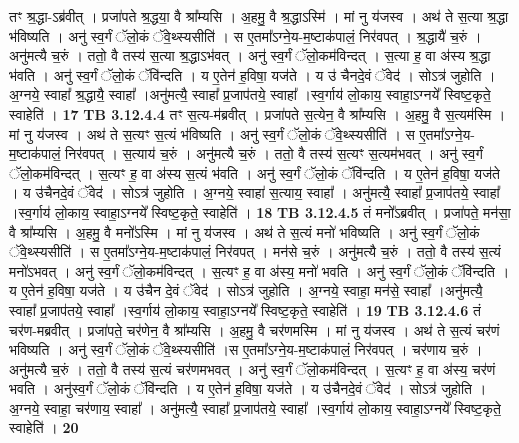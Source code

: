 \documentclass[17pt]{extarticle}
\begin{document}
{{{{{{{{{{{{{{{{{{{{{{{                  तꣳ श्र॒द्धा-ऽब्र॑वीत् । प्रजा॑पते श्र॒द्धया॒ वै श्रा᳚म्यसि । अ॒हमु॒ वै श्र॒द्धाऽस्मि॑ । मां नु य॑जस्व । अथ॑ ते स॒त्या श्र॒द्धा भ॑विष्यति । अनु॑ स्व॒र्गं ॅलो॒कं ॅवे॒थ्स्यसीति॑ । स ए॒तमा᳚ऽग्ने॒य-म॒ष्टाक॑पालं॒ निर॑वपत् । श्र॒द्धायै॑ च॒रुं । अनु॑मत्यै च॒रुं । ततो॒ वै तस्य॑ स॒त्या श्र॒द्धाऽभ॑वत् । अनु॑ स्व॒र्गं ॅलो॒कम॑विन्दत् । स॒त्या ह॒ वा अ॑स्य श्र॒द्धा भ॑वति । अनु॑ स्व॒र्गं ॅलो॒कं ॅवि॑न्दति । य ए॒तेन॑ ह॒विषा॒ यज॑ते । य उ॑ चैनदे॒वं ॅवेद॑ । सोऽत्र॑ जुहोति । अ॒ग्नये॒ स्वाहा᳚ श्र॒द्धायै॒ स्वाहा᳚ ।अनु॑मत्यै॒ स्वाहा᳚ प्र॒जाप॑तये॒ स्वाहा᳚ ।स्व॒र्गाय॑ लो॒काय॒ स्वाहा॒ऽग्नये᳚ स्विष्ट॒कृते॒ स्वाहेति॑ । \textbf{ 17} \newline
                  \newline
                                \textbf{ TB 3.12.4.4} \newline
                  तꣳ स॒त्य-म॑ब्रवीत् । प्रजा॑पते स॒त्येन॒ वै श्रा᳚म्यसि । अ॒हमु॒ वै स॒त्यम॑स्मि । मां नु य॑जस्व । अथ॑ ते स॒त्यꣳ स॒त्यं भ॑विष्यति । अनु॑ स्व॒र्गं ॅलो॒कं ॅवे॒थ्स्यसीति॑ । स ए॒तमा᳚ऽग्ने॒य-म॒ष्टाक॑पालं॒ निर॑वपत् । स॒त्याय॑ च॒रुं । अनु॑मत्यै च॒रुं । ततो॒ वै तस्य॑ स॒त्यꣳ स॒त्यम॑भवत् । अनु॑ स्व॒र्गं ॅलो॒कम॑विन्दत् । स॒त्यꣳ ह॒ वा अ॑स्य स॒त्यं भ॑वति । अनु॑ स्व॒र्गं ॅलो॒कं ॅवि॑न्दति । य ए॒तेन॑ ह॒विषा॒ यज॑ते । य उ॑चैनदे॒वं ॅवेद॑ । सोऽत्र॑ जुहोति । अ॒ग्नये॒ स्वाहा॑ स॒त्याय॒ स्वाहा᳚ । अनु॑मत्यै॒ स्वाहा᳚ प्र॒जाप॑तये॒ स्वाहा᳚ ।स्व॒र्गाय॑ लो॒काय॒ स्वाहा॒ऽग्नये᳚ स्विष्ट॒कृते॒ स्वाहेति॑ । \textbf{ 18} \newline
                  \newline
                                \textbf{ TB 3.12.4.5} \newline
                  तं मनो᳚ऽब्रवीत् । प्रजा॑पते॒ मन॑सा॒ वै श्रा᳚म्यसि । अ॒हमु॒ वै मनो᳚ऽस्मि । मां नु य॑जस्व । अथ॑ ते स॒त्यं मनो॑ भविष्यति । अनु॑ स्व॒र्गं ॅलो॒कं ॅवे॒थ्स्यसीति॑ । स ए॒तमा᳚ऽग्ने॒य-म॒ष्टाक॑पालं॒ निर॑वपत् । मन॑से च॒रुं । अनु॑मत्यै च॒रुं । ततो॒ वै तस्य॑ स॒त्यं मनो॑ऽभवत् । अनु॑ स्व॒र्गं ॅलो॒कम॑विन्दत् । स॒त्यꣳ ह॒ वा अ॑स्य॒ मनो॑ भवति । अनु॑ स्व॒र्गं ॅलो॒कं ॅवि॑न्दति । य ए॒तेन॑ ह॒विषा॒ यज॑ते । य उ॑चैन दे॒वं ॅवेद॑ । सोऽत्र॑ जुहोति । अ॒ग्नये॒ स्वाहा॒ मन॑से॒ स्वाहा᳚ ।अनु॑मत्यै॒ स्वाहा᳚ प्र॒जाप॑तये॒ स्वाहा᳚ ।स्व॒र्गाय॑ लो॒काय॒ स्वाहा॒ऽग्नये᳚ स्विष्ट॒कृते॒ स्वाहेति॑ । \textbf{ 19} \newline
                  \newline
                                \textbf{ TB 3.12.4.6} \newline
                  तं चर॑ण-मब्रवीत् । प्रजा॑पते॒ चर॑णेन॒ वै श्रा᳚म्यसि । अ॒हमु॒ वै चर॑णमस्मि । मां नु य॑जस्व । अथ॑ ते स॒त्यं चर॑णं भविष्यति । अनु॑ स्व॒र्गं ॅलो॒कं ॅवे॒थ्स्यसीति॑ ।स ए॒तमा᳚ऽग्ने॒य-म॒ष्टाक॑पालं॒ निर॑वपत् । चर॑णाय च॒रुं । अनु॑मत्यै च॒रुं । ततो॒ वै तस्य॑ स॒त्यं चर॑णमभवत् । अनु॑ स्व॒र्गं ॅलो॒कम॑विन्दत् । स॒त्यꣳ ह॒ वा अ॑स्य॒ चर॑णं भवति । अनु॑स्व॒र्गं ॅलो॒कं ॅवि॑न्दति । य ए॒तेन॑ ह॒विषा॒ यज॑ते । य उ॑चैनदे॒वं ॅवेद॑ । सोऽत्र॑ जुहोति । अ॒ग्नये॒ स्वाहा॒ चर॑णाय॒ स्वाहा᳚ । अनु॑मत्यै॒ स्वाहा᳚ प्र॒जाप॑तये॒ स्वाहा᳚ ।स्व॒र्गाय॑ लो॒काय॒ स्वाहा॒ऽग्नये᳚ स्विष्ट॒कृते॒ स्वाहेति॑ । \textbf{ 20} \newline
}}}}}}}}}}}}}}}}}}}}}}}
\end{document}
